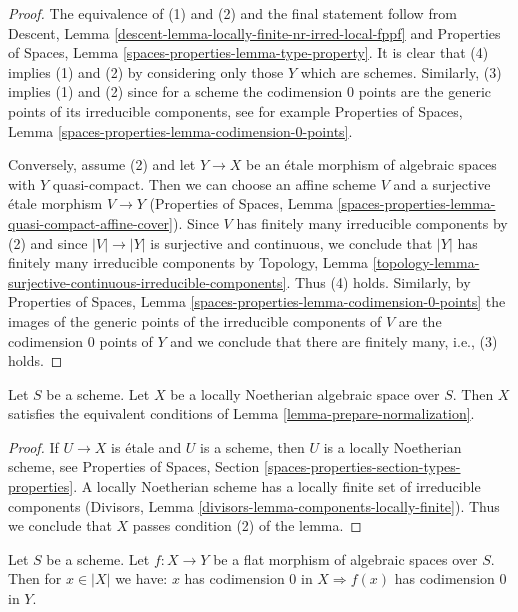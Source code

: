 \begin{proof}
The equivalence of (1) and (2) and the final statement follow from
Descent, Lemma \ref{descent-lemma-locally-finite-nr-irred-local-fppf} and
Properties of Spaces, Lemma \ref{spaces-properties-lemma-type-property}.
It is clear that (4) implies (1) and (2) by considering only those $Y$
which are schemes. Similarly, (3) implies (1) and (2) since for a scheme
the codimension $0$ points are the generic points of its
irreducible components, see for example
Properties of Spaces, Lemma \ref{spaces-properties-lemma-codimension-0-points}.

\medskip\noindent
Conversely, assume (2) and let $Y \to X$ be an \'etale morphism of
algebraic spaces with $Y$ quasi-compact. Then we can choose an affine
scheme $V$ and a surjective \'etale morphism $V \to Y$
(Properties of Spaces, Lemma
\ref{spaces-properties-lemma-quasi-compact-affine-cover}).
Since $V$ has finitely many irreducible components by (2) and since
$|V| \to |Y|$ is surjective and continuous, we conclude that
$|Y|$ has finitely many irreducible components by Topology, Lemma
\ref{topology-lemma-surjective-continuous-irreducible-components}.
Thus (4) holds. Similarly, by
Properties of Spaces, Lemma \ref{spaces-properties-lemma-codimension-0-points}
the images of the generic points of the irreducible components of $V$
are the codimension $0$ points of $Y$ and we conclude that there are
finitely many, i.e., (3) holds.
\end{proof}

\begin{lemma}
\label{lemma-locally-noetherian-can-be-normalized}
Let $S$ be a scheme. Let $X$ be a locally Noetherian algebraic space
over $S$. Then $X$ satisfies the equivalent conditions of
Lemma \ref{lemma-prepare-normalization}.
\end{lemma}

\begin{proof}
If $U \to X$ is \'etale and $U$ is a scheme, then $U$ is a locally Noetherian
scheme, see Properties of Spaces, Section
\ref{spaces-properties-section-types-properties}.
A locally Noetherian scheme has a locally finite set of irreducible
components (Divisors, Lemma \ref{divisors-lemma-components-locally-finite}).
Thus we conclude that $X$ passes condition (2) of the lemma.
\end{proof}

\begin{lemma}
\label{lemma-flat-image-point-codimension-0}
Let $S$ be a scheme. Let $f : X \to Y$ be a flat morphism of algebraic
spaces over $S$. Then for $x \in |X|$ we have: $x$ has codimension $0$ in
$X \Rightarrow f(x)$ has codimension $0$ in $Y$.
\end{lemma}

